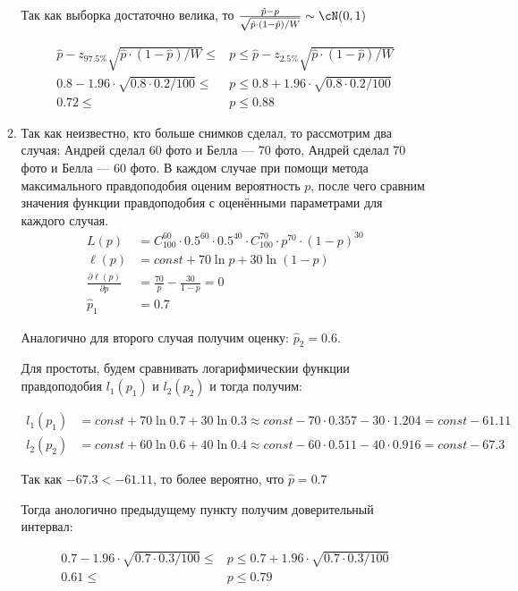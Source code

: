 \begin{enumerate}
\begin{enumerate}
Так как выборка достаточно велика, то $\frac{\hat{p}-p}{\sqrt{\hat{p}\cdot(1-\hat{p})/W}}\sim \cN(0,1)$

\begin{align*}
\hat{p}-z_{97.5\%}\sqrt{\hat{p}\cdot(1-\hat{p})/W} \le &p \le \hat{p}-z_{2.5\%}\sqrt{\hat{p}\cdot(1-\hat{p})/W} \\
0.8-1.96\cdot\sqrt{0.8\cdot0.2/100}\le &p\le0.8+1.96\cdot\sqrt{0.8\cdot0.2/100} \\
0.72\le &p\le 0.88
\end{align*}

\item Так как неизвестно, кто больше снимков сделал, то рассмотрим два случая: Андрей сделал 60 фото и Белла — 70 фото, Андрей сделал 70 фото и Белла — 60 фото. В каждом случае при помощи метода максимального правдоподобия оценим вероятность $p$, после чего сравним значения функции правдоподобия с оценёнными параметрами для каждого случая.
\begin{align*}
L(p)&=C^{60}_{100}\cdot 0.5^{60}\cdot 0.5^{40}\cdot C^{70}_{100}\cdot p^{70}\cdot(1-p)^{30} \\
\ell(p)&=const+70\ln p+30\ln(1-p) \\
\frac{\partial \ell (p)}{\partial p}&= \frac{70}{p}-\frac{30}{1-p}=0 \\
\hat{p}_1 &= 0.7
\end{align*}

Аналогично для второго случая получим оценку: $\hat{p}_2=0.6$.

Для простоты, будем сравнивать логарифмическии функции правдоподобия $l_1(p_1)$ и $l_2(p_2)$ и тогда получим:

\begin{align*}
l_1(p_1)&=const+70\ln 0.7+30\ln 0.3\approx const-70\cdot0.357-30\cdot 1.204=const-61.11 \\
l_2(p_2)&=const+60\ln 0.6+40\ln 0.4\approx const-60\cdot0.511-40\cdot0.916=const-67.3
\end{align*}

Так как $-67.3<-61.11$, то более вероятно, что $\hat{p}=0.7$

Тогда анологично предыдущему пункту получим доверительный интервал:

\begin{align*}
0.7-1.96\cdot\sqrt{0.7\cdot0.3/100}\le &p \le0.7+1.96\cdot\sqrt{0.7\cdot0.3/100} \\
0.61 \le &p \le 0.79
\end{align*}
\end{enumerate}
\end{enumerate}


